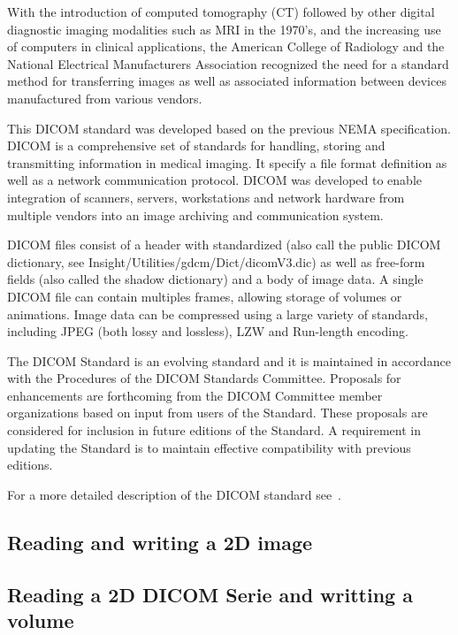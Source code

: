 With the introduction of computed tomography (CT) followed by other digital diagnostic imaging modalities such as MRI in the 1970's, and the increasing use of computers in clinical applications, the American
College of Radiology and the National Electrical Manufacturers Association recognized
the need for a standard method for transferring images as well as associated information between
devices manufactured from various vendors.

This DICOM standard was developed based on the previous NEMA specification. 
DICOM is a comprehensive set of standards for handling, storing and transmitting information in 
medical imaging. It specify a file format definition as well as a network communication protocol.
DICOM was developed to enable integration of scanners, servers, workstations and network hardware from
multiple vendors into an image archiving and communication system.

DICOM files consist of a header with standardized (also call the public DICOM dictionary, see 
Insight/Utilities/gdcm/Dict/dicomV3.dic) as well as free-form fields (also called the shadow dictionary) 
and a body of image data. A single DICOM file can contain multiples frames, 
allowing storage of volumes or animations. Image data can be compressed using a large variety of 
standards, including JPEG (both lossy and lossless), LZW and Run-length encoding.

The DICOM Standard is an evolving standard and it is maintained in accordance with the Procedures of
the DICOM Standards Committee. Proposals for enhancements are forthcoming from the DICOM
Committee member organizations based on input from users of the Standard. These proposals are
considered for inclusion in future editions of the Standard. A requirement in updating the Standard is to
maintain effective compatibility with previous editions.

For a more detailed description of the DICOM standard see~\cite{DICOMStandard}.

\subsection{Reading and writing a 2D image}


\subsection{Reading a 2D DICOM Serie and writting a volume}


